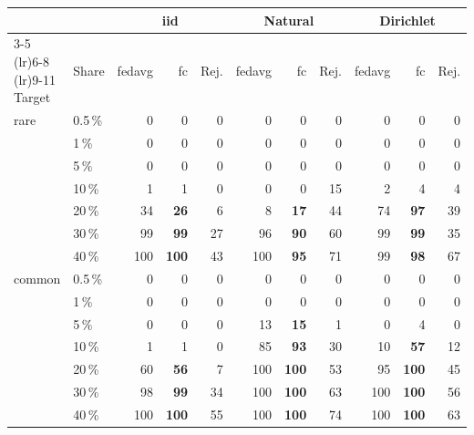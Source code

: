 \begin{tabular}{llrrrrrrrrr}
\toprule
 & & \multicolumn{3}{c}{\gls{iid}} & \multicolumn{3}{c}{Natural} & \multicolumn{3}{c}{Dirichlet} \\
\cmidrule(lr){3-5} \cmidrule(lr){6-8} \cmidrule(lr){9-11}
Target & Share & \gls{fedavg} & \gls{fc} & Rej. & \gls{fedavg} & \gls{fc} & Rej. & \gls{fedavg} & \gls{fc} & Rej. \\
\midrule
rare & 0.5\,\% & 0 & 0 & 0 & 0 & 0 & 0 & 0 & 0 & 0 \\
 & 1\,\% & 0 & 0 & 0 & 0 & 0 & 0 & 0 & 0 & 0 \\
 & 5\,\% & 0 & 0 & 0 & 0 & 0 & 0 & 0 & 0 & 0 \\
 & 10\,\% & 1 & 1 & 0 & 0 & 0 & 15 & 2 & 4 & 4 \\
 & 20\,\% & 34 & \textbf{26} & 6 & 8 & \textbf{17} & 44 & 74 & \textbf{97} & 39 \\
 & 30\,\% & 99 & \textbf{99} & 27 & 96 & \textbf{90} & 60 & 99 & \textbf{99} & 35 \\
 & 40\,\% & 100 & \textbf{100} & 43 & 100 & \textbf{95} & 71 & 99 & \textbf{98} & 67 \\
\midrule
common & 0.5\,\% & 0 & 0 & 0 & 0 & 0 & 0 & 0 & 0 & 0 \\
 & 1\,\% & 0 & 0 & 0 & 0 & 0 & 0 & 0 & 0 & 0 \\
 & 5\,\% & 0 & 0 & 0 & 13 & \textbf{15} & 1 & 0 & 4 & 0 \\
 & 10\,\% & 1 & 1 & 0 & 85 & \textbf{93} & 30 & 10 & \textbf{57} & 12 \\
 & 20\,\% & 60 & \textbf{56} & 7 & 100 & \textbf{100} & 53 & 95 & \textbf{100} & 45 \\
 & 30\,\% & 98 & \textbf{99} & 34 & 100 & \textbf{100} & 63 & 100 & \textbf{100} & 56 \\
 & 40\,\% & 100 & \textbf{100} & 55 & 100 & \textbf{100} & 74 & 100 & \textbf{100} & 63 \\
\bottomrule
\end{tabular}
